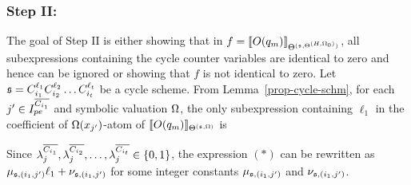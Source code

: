 \subsubsection{Step II:}
The goal of Step II is either showing that in $f=\llbracket O(q_m)\rrbracket_{\Theta^{({\mathfrak{s} },\Theta^{(H,\Omega_0)})}}$, all subexpressions containing the cycle counter variables are identical to zero and hence can be ignored or showing that $f$ is not identical to zero. Let ${\mathfrak{s} }=C_{i_1}^{\ell_1} C_{i_2}^{\ell_2} \dots C_{i_t}^{\ell_t}$ be a cycle scheme. From Lemma~\ref{prop-cycle-schm}, for each $j'\in I^{\overline{C_{i_1}}}_{pe}$ and symbolic valuation $\Omega$, the only subexpression containing $\ell_1$ in the coefficient of $\Omega(x_{j'})$-atom of $\llbracket O(q_m)\rrbracket_{\Theta^{({\mathfrak{s} },\Omega)}}$ is
\begin{center}
\end{center}
Since $\lambda^{\overline{C_{i_1}}}_{j}, \lambda^{\overline{C_{i_2}}}_{j}, \dots, \lambda^{\overline{C_{i_t}}}_{j} \in \{0, 1\}$, the expression $(\ast)$  can be rewritten as  
 $\mu_{{\mathfrak{s} }, (i_1,j')} \ell_1 + \nu_{{\mathfrak{s} }, (i_1,j')}$ for some integer constants $\mu_{{\mathfrak{s} }, (i_1,j')}$ and $\nu_{{\mathfrak{s} }, (i_1,j')}$. 
 
